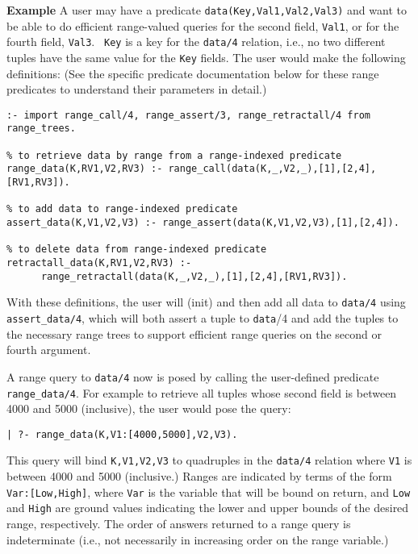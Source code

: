 {\bf Example}
A user may have a predicate {\tt data(Key,Val1,Val2,Val3)}
and want to be able to do efficient range-valued queries for the
second field, {\tt Val1}, or for the fourth field, {\tt Val3}.  {\tt
  Key} is a key for the {\tt data/4} relation, i.e., no two different
tuples have the same value for the {\tt Key} fields.  The user would
make the following definitions: (See the specific predicate
documentation below for these range predicates to understand their
parameters in detail.)

\begin{verbatim}
:- import range_call/4, range_assert/3, range_retractall/4 from range_trees.

% to retrieve data by range from a range-indexed predicate
range_data(K,RV1,V2,RV3) :- range_call(data(K,_,V2,_),[1],[2,4],[RV1,RV3]).

% to add data to range-indexed predicate
assert_data(K,V1,V2,V3) :- range_assert(data(K,V1,V2,V3),[1],[2,4]).

% to delete data from range-indexed predicate
retractall_data(K,RV1,V2,RV3) :- 
      range_retractall(data(K,_,V2,_),[1],[2,4],[RV1,RV3]).
\end{verbatim}	   

With these definitions, the user will (init) and then add all data to
{\tt data/4} using {\tt assert\_data/4}, which will both assert a
tuple to {\tt data}/4 and add the tuples to the necessary range trees
to support efficient range queries on the second or fourth argument.

A range query to {\tt data/4} now is posed by calling the
user-defined predicate {\tt range\_data/4}.  For example to retrieve
all tuples whose second field is between 4000 and 5000 (inclusive),
the user would pose the query:

\begin{verbatim}
| ?- range_data(K,V1:[4000,5000],V2,V3).
\end{verbatim}

 This query will bind {\tt K,V1,V2,V3} to quadruples in the
{\tt data/4} relation where {\tt V1} is between 4000 and 5000
(inclusive.)  Ranges are indicated by terms of the form
{\tt Var:[Low,High]}, where {\tt Var} is the variable that will be
bound on return, and {\tt Low} and {\tt High} are ground values
indicating the lower and upper bounds of the desired range,
respectively.  The order of answers returned to a range query is
indeterminate (i.e., not necessarily in increasing order on the range
variable.)

